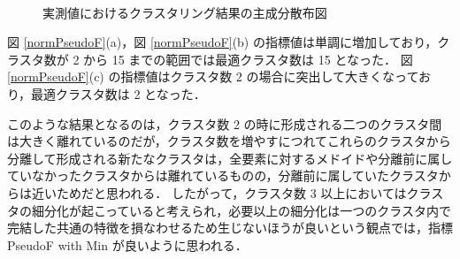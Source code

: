 \documentclass[a4j]{jarticle}
\begin{document}
\begin{figure}[tb]
\begin{center}
~
\caption{実測値におけるクラスタリング結果の主成分散布図}
\label{normPseudoFresultPlot}
\end{center}
\end{figure}

図 \ref{normPseudoF}(a)，図 \ref{normPseudoF}(b) の指標値は単調に増加しており，クラスタ数が 2 から 15 までの範囲では最適クラスタ数は 15 となった．
図 \ref{normPseudoF}(c) の指標値はクラスタ数 2 の場合に突出して大きくなっており，最適クラスタ数は 2 となった．

このような結果となるのは，クラスタ数 2 の時に形成される二つのクラスタ間は大きく離れているのだが，クラスタ数を増やすにつれてこれらのクラスタから分離して形成される新たなクラスタは，全要素に対するメドイドや分離前に属していなかったクラスタからは離れているものの，分離前に属していたクラスタからは近いためだと思われる．
したがって，クラスタ数 3 以上においてはクラスタの細分化が起こっていると考えられ，必要以上の細分化は一つのクラスタ内で完結した共通の特徴を損なわせるため生じないほうが良いという観点では，指標 PseudoF with Min が良いように思われる．
\end{document}
